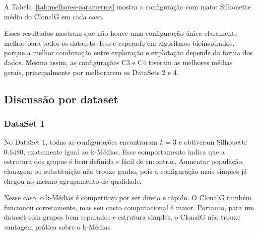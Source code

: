 \documentclass[12pt,a4paper]{article}
\begin{document}
A Tabela~\ref{tab:melhores-parametros} mostra a configuração com maior Silhouette médio do ClonalG em cada caso.

\begin{table}[H]
\centering
\caption{Melhores parâmetros encontrados para cada dataset.}
\label{tab:melhores-parametros}
\end{table}

Esses resultados mostram que não houve uma configuração única claramente melhor para todos os datasets. Isso é esperado em algoritmos bioinspirados, porque a melhor combinação entre exploração e explotação depende da forma dos dados. Mesmo assim, as configurações C3 e C4 tiveram as melhores médias gerais, principalmente por melhorarem os DataSets 2 e 4.

\subsection{Discussão por dataset}

\subsubsection*{DataSet 1}

No DataSet 1, todas as configurações encontraram \(k=3\) e obtiveram Silhouette 0.6480, exatamente igual ao k-Médias. Esse comportamento indica que a estrutura dos grupos é bem definida e fácil de encontrar. Aumentar população, clonagem ou substituição não trouxe ganho, pois a configuração mais simples já chegou ao mesmo agrupamento de qualidade.

Nesse caso, o k-Médias é competitivo por ser direto e rápido. O ClonalG também funcionou corretamente, mas seu custo computacional é maior. Portanto, para um dataset com grupos bem separados e estrutura simples, o ClonalG não trouxe vantagem prática sobre o k-Médias.
\end{document}

